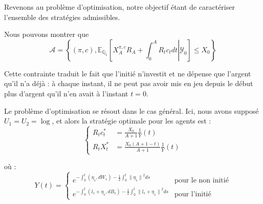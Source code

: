 \documentclass[../finalreport.tex]{subfiles}
\begin{document}
\par Revenons au problème d'optimisation, notre objectif étant de caractériser l'ensemble des stratégies admissibles.

\par Nous pouvons montrer que 
\begin{displaymath}
\mathcal{A} = \left\lbrace \left( \pi, c \right), \mathbb{E}_{\mathbb{Q}_1} \left[ X_A^{\pi, c} R_A + \int_0^A R_t c_t dt \left\vert\right. \mathcal{Y}_0 \right] \leq X_0 \right\rbrace
\end{displaymath}

\par Cette contrainte traduit le fait que l'initié n'investit et ne dépense que l'argent qu'il n'a déjà : à chaque instant, il ne peut pas avoir mis en jeu depuis le début plus d'argent qu'il n'en avait à l'instant $t = 0$.
\\

\par Le problème d'optimisation se résout dans le cas général. Ici, nous avons supposé $U_1 = U_2 = \log$, et alors la stratégie optimale pour les agents est :
\begin{displaymath}
\begin{cases}
R_t c_t^* &= \frac{X_0}{A + 1} \frac{1}{Y} \left( t \right) \\
R_t X_t^* &= \frac{X_0 \left( A + 1 - t \right)}{A + 1} \frac{1}{Y} \left( t \right)
\end{cases}
\end{displaymath}

\par où : 
\begin{displaymath}
Y \left( t \right) = 
\begin{cases}
e^{- \int_{0}^{t} \left( \eta_s, dW_{s} \right)-\frac{1}{2} \int_{0}^{t} {\| \eta_s \|}^{2} ds} & \text{pour le non initié} \\
e^{- \int_{0}^{t} \left( l_{s} + \eta_s, dB_{s} \right) - \frac{1}{2} \int_{0}^{t} {\| l_{s} + \eta_s \|}^{2} ds} & \text{pour l'initié}
\end{cases}
\end{displaymath}
\end{document}
